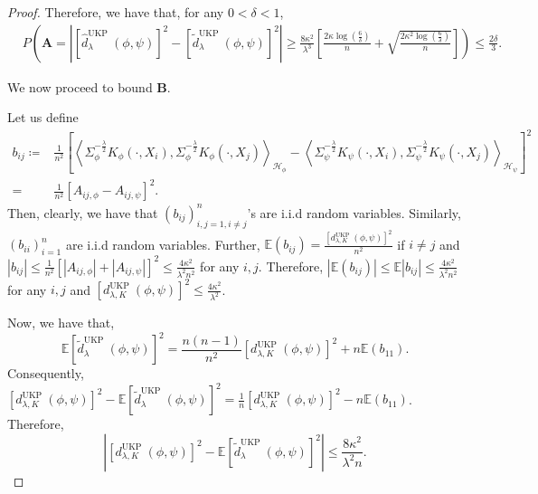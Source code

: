 \documentclass[11pt]{article}
\newcommand{\E}{\mathbb{E}}
\newcommand{\repone}{\phi}
\newcommand{\reptwo}{\psi}
\newcommand{\Hone}{\mathcal{H}_{\phi}}
\newcommand{\Htwo}{\mathcal{H}_{\psi}}
\newcommand{\inprod}[1]{\left \langle #1 \right\rangle}
\newcommand{\metricstname}{UKP }
\theoremstyle{plain}
\begin{document}
\begin{proof}
Therefore, we have that, for any $0<\delta<1$,
\[
\begin{aligned}
    &P\left(\mathbf{A}=\left|\left[\hat{d}_{\lambda}^{\text{\metricstname}}(\repone,\reptwo)\right]^{2} - \left[\tilde{d}_{\lambda}^{\text{\metricstname}}(\repone,\reptwo)\right]^{2}\right|\right.\geq \left.\frac{8\kappa^{2}}{\lambda^{3}}\left[\frac{2\kappa\log(\frac{6}{\delta})}{n} + \sqrt{\frac{2\kappa^{2}\log(\frac{6}{\delta})}{n}}\right]\right) \leq \frac{2\delta}{3}.
\end{aligned}
\]

We now proceed to bound $\mathbf{B}$.

Let us define 
\[
\begin{aligned}
    b_{ij} \coloneq& \frac{1}{n^{2}}\left[\inprod{\Sigma_{\repone}^{-\frac{\lambda}{2}}K_{\repone}(\cdot,X_{i}),\Sigma_{\repone}^{-\frac{\lambda}{2}}K_{\repone}(\cdot,X_{j})}_{\Hone}-\right.\left.\inprod{\Sigma_{\reptwo}^{-\frac{\lambda}{2}}K_{\reptwo}(\cdot,X_{i}),\Sigma_{\reptwo}^{-\frac{\lambda}{2}}K_{\reptwo}(\cdot,X_{j})}_{\Htwo}\right]^{2}\\
    =&\frac{1}{n^{2}}\left[A_{ij,\repone}-A_{ij,\reptwo}\right]^{2}.
\end{aligned}
\]
Then, clearly, we have that $\left(b_{ij}\right)_{i,j=1,i \neq j}^{n}$'s are i.i.d random variables. Similarly, $\left(b_{ii}\right)_{i=1}^{n}$ are i.i.d random variables. Further, $\E(b_{ij})=\frac{\left[d_{\lambda,K}^{\text{\metricstname}}(\repone,\reptwo)\right]^{2}}{n^{2}}$ if $i\neq j$ and $|b_{ij}|\leq \frac{1}{n^{2}}\left[|A_{ij,\repone}|+|A_{ij,\reptwo}|\right]^{2}\leq \frac{4\kappa^{2}}{\lambda^{2} n^{2}}$ for any $i,j$. Therefore, $\left|\E(b_{ij})\right|\leq \E\left|b_{ij}\right|\leq  \frac{4\kappa^{2}}{\lambda^{2} n^{2}}$ for any $i,j$ and $\left[d_{\lambda,K}^{\text{\metricstname}}(\repone,\reptwo)\right]^{2} \leq \frac{4\kappa^{2}}{\lambda^{2}}$.

Now, we have that, $$\E\left[\tilde{d}_{\lambda}^{\text{\metricstname}}(\repone,\reptwo)\right]^{2} = \frac{n(n-1)}{n^{2}}\left[d_{\lambda,K}^{\text{\metricstname}}(\repone,\reptwo)\right]^{2} + n\E(b_{11}).$$ Consequently, $\left[d_{\lambda,K}^{\text{\metricstname}}(\repone,\reptwo)\right]^{2} - \E\left[\tilde{d}_{\lambda}^{\text{\metricstname}}(\repone,\reptwo)\right]^{2} = \frac{1}{n}\left[d_{\lambda,K}^{\text{\metricstname}}(\repone,\reptwo)\right]^{2} - n\E(b_{11})$. Therefore, $$\left|\left[d_{\lambda,K}^{\text{\metricstname}}(\repone,\reptwo)\right]^{2} - \E\left[\tilde{d}_{\lambda}^{\text{\metricstname}}(\repone,\reptwo)\right]^{2}\right|\leq \frac{8\kappa^{2}}{\lambda^{2} n}.$$ 


\end{proof}
\end{document}
